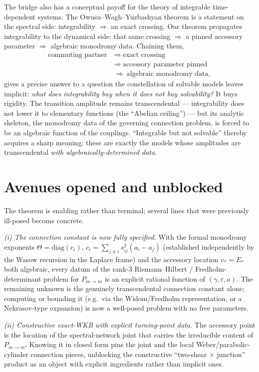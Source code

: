 \documentclass[aps,prl,reprint,nofootinbib,superscriptaddress]{revtex4-2}
\newcommand{\eps}{\varepsilon}
\newcommand{\Pmid}{P_{m\to m}}
\newcommand{\diag}{\mathrm{diag}}
\begin{document}
The bridge also has a conceptual payoff for the theory of integrable time-dependent systems. The
Owusu--Wagh--Yuzbashyan theorem is a statement on the spectral side: integrability $\Rightarrow$ an
exact crossing. Our theorem propagates integrability to the dynamical side: that same crossing
$\Rightarrow$ a pinned accessory parameter $\Rightarrow$ algebraic monodromy data. Chaining them,
\begin{equation*}
\begin{aligned}
\text{commuting partner}
  &\ \Rightarrow\ \text{exact crossing}\\
  &\ \Rightarrow\ \text{accessory parameter pinned}\\
  &\ \Rightarrow\ \text{algebraic monodromy data},
\end{aligned}
\end{equation*}
gives a precise answer to a question the constellation of solvable models leaves implicit: \emph{what
does integrability buy when it does not buy solvability?} It buys rigidity. The transition amplitude
remains transcendental --- integrability does not lower it to elementary functions (the ``Abelian
ceiling'') --- but its analytic skeleton, the monodromy data of the governing connection problem, is
forced to be an algebraic function of the couplings. ``Integrable but not solvable'' thereby acquires
a sharp meaning: these are exactly the models whose amplitudes are transcendental \emph{with
algebraically-determined data}.

\section{Avenues opened and unblocked}
The theorem is enabling rather than terminal; several lines that were previously ill-posed become
concrete.

\emph{(i) The connection constant is now fully specified.} With the formal monodromy exponents
$\Theta=\diag(c_i)$, $c_i=\sum_{j\ne i}s_{ij}^2(a_i-a_j)$ (established independently by the Wasow
recursion in the Laplace frame) and the accessory location $v_*=E_*$ both algebraic, every datum of
the rank-3 Riemann--Hilbert / Fredholm-determinant problem for $\Pmid$ is an explicit rational
function of $(\gamma,\eps,a)$. The remaining unknown is the genuinely transcendental connection
constant alone; computing or bounding it (e.g.\ via the Widom/Fredholm representation, or a Nekrasov-type
expansion) is now a well-posed problem with no free parameters.

\emph{(ii) Constructive exact-WKB with explicit turning-point data.} The accessory point is the
location of the spectral-network joint that carries the irreducible content of $\Pmid$. Knowing it in
closed form pins the joint and the local Weber/parabolic-cylinder connection pieces, unblocking the
constructive ``two-shear $\times$ junction'' product as an object with explicit ingredients rather than
implicit ones.
\end{document}
